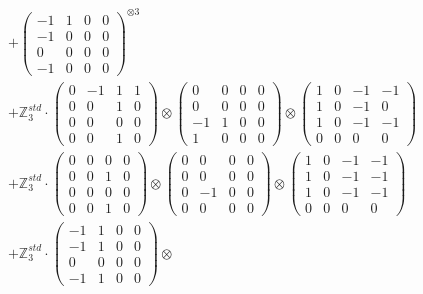 \documentclass{article}
\begin{document}
{\begin{align}
        &+ \label{Rs16-Rc11-Solution-25-c16} \begin{pmatrix} -1 & 1 & 0 & 0 \\ -1 & 0 & 0 & 0 \\ 0 & 0 & 0 & 0 \\ -1 & 0 & 0 & 0 \end{pmatrix}^{\otimes 3} \\
        &+ \label{Rs16-Rc11-Solution-25-c17} \mathbb{Z}_3^{std} \cdot 
            \begin{pmatrix} 0 & -1 & 1 & 1 \\ 0 & 0 & 1 & 0 \\ 0 & 0 & 0 & 0 \\ 0 & 0 & 1 & 0 \end{pmatrix} \otimes 
            \begin{pmatrix} 0 & 0 & 0 & 0 \\ 0 & 0 & 0 & 0 \\ -1 & 1 & 0 & 0 \\ 1 & 0 & 0 & 0 \end{pmatrix} \otimes 
            \begin{pmatrix} 1 & 0 & -1 & -1 \\ 1 & 0 & -1 & 0 \\ 1 & 0 & -1 & -1 \\ 0 & 0 & 0 & 0 \end{pmatrix} \\ 
        &+ \label{Rs16-Rc11-Solution-25-c18} \mathbb{Z}_3^{std} \cdot 
            \begin{pmatrix} 0 & 0 & 0 & 0 \\ 0 & 0 & 1 & 0 \\ 0 & 0 & 0 & 0 \\ 0 & 0 & 1 & 0 \end{pmatrix} \otimes 
            \begin{pmatrix} 0 & 0 & 0 & 0 \\ 0 & 0 & 0 & 0 \\ 0 & -1 & 0 & 0 \\ 0 & 0 & 0 & 0 \end{pmatrix} \otimes 
            \begin{pmatrix} 1 & 0 & -1 & -1 \\ 1 & 0 & -1 & -1 \\ 1 & 0 & -1 & -1 \\ 0 & 0 & 0 & 0 \end{pmatrix} \\ 
        &+ \label{Rs16-Rc11-Solution-25-c19} \mathbb{Z}_3^{std} \cdot 
            \begin{pmatrix} -1 & 1 & 0 & 0 \\ -1 & 1 & 0 & 0 \\ 0 & 0 & 0 & 0 \\ -1 & 1 & 0 & 0 \end{pmatrix} \otimes 

\end{align}}
\end{document}

